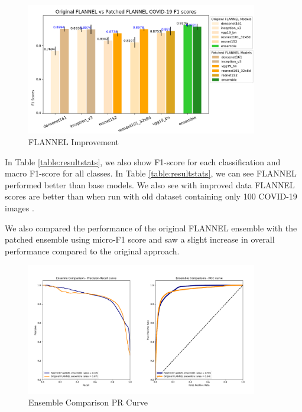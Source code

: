\documentclass{sigkddExp}
\begin{document}
\begin{figure}[h]
    \centering
    \includegraphics[width=0.9\textwidth]{../doc/images/original_vs_patched_flannel_f1.png}
    \caption{FLANNEL Improvement}
    \label{fig:f1score}
\end{figure}


In Table \ref{table:resultstats}, we also show F1-score for each classification
and macro F1-score for all classes. In Table \ref{table:resultstats}, we can see
FLANNEL performed better than base models. We also see with improved data FLANNEL
scores are better than when run with old dataset containing only 100 COVID-19 images
\cite{10.1093/jamia/ocaa280}.


We also compared the performance of the original FLANNEL ensemble with the
patched ensemble using micro-F1 score and saw a slight increase in overall
performance compared to the original approach.

\begin{figure}[h]
    \centering
    \includegraphics[width=0.9\textwidth]{../doc/images/ensemble_comparison.png}
    \caption{Ensemble Comparison PR Curve}
    \label{fig:ec_prcurve}
\end{figure}
\end{document}
